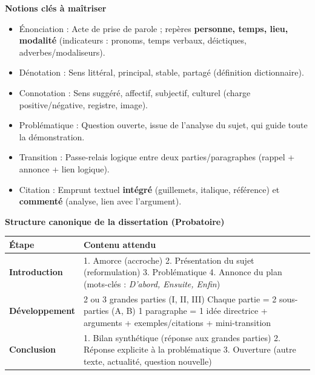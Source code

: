 \documentclass[11pt]{article}
\newcommand{\cle}[1]{{\popxbold\color{popdark}#1}}
\begin{document}
\begin{bilan}
\textbf{Notions clés à maîtriser}
\begin{itemize}
    \item \cle{Énonciation} : Acte de prise de parole ; repères \textbf{personne, temps, lieu, modalité} (indicateurs : pronoms, temps verbaux, déictiques, adverbes/modaliseurs).
    \item \cle{Dénotation} : Sens littéral, principal, stable, partagé (définition dictionnaire).
    \item \cle{Connotation} : Sens suggéré, affectif, subjectif, culturel (charge positive/négative, registre, image).
    \item \cle{Problématique} : Question ouverte, issue de l'analyse du sujet, qui guide toute la démonstration.
    \item \cle{Transition} : Passe-relais logique entre deux parties/paragraphes (rappel + annonce + lien logique).
    \item \cle{Citation} : Emprunt textuel \textbf{intégré} (guillemets, italique, référence) et \textbf{commenté} (analyse, lien avec l'argument).
\end{itemize}

\textbf{Structure canonique de la dissertation (Probatoire)}
\begin{center}
\begin{tabularx}{\linewidth}{|>{\bfseries}l|X|}\hline
\textbf{Étape} & \textbf{Contenu attendu} \\ \hline
\rowcolor{popblueL} \textbf{Introduction} & 1. Amorce (accroche) \textbullet{} 2. Présentation du sujet (reformulation) \textbullet{} 3. Problématique \textbullet{} 4. Annonce du plan (mots-clés : \emph{D'abord, Ensuite, Enfin}) \\ \hline
\textbf{Développement} & 2 ou 3 grandes parties (I, II, III) \textbullet{} Chaque partie = 2 sous-parties (A, B) \textbullet{} 1 paragraphe = 1 idée directrice + arguments + exemples/citations + mini-transition \\ \hline
\rowcolor{popgreenL} \textbf{Conclusion} & 1. Bilan synthétique (réponse aux grandes parties) \textbullet{} 2. Réponse explicite à la problématique \textbullet{} 3. Ouverture (autre texte, actualité, question nouvelle) \\ \hline
\end{tabularx}
\end{center}


\end{bilan}
\end{document}
